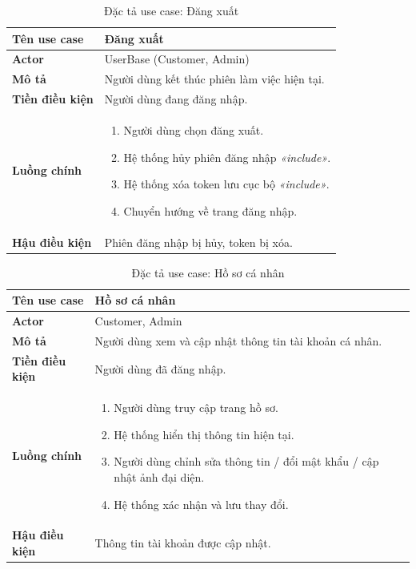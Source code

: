 \begin{table}[H]
\centering
\caption{Đặc tả use case: Đăng xuất}
\begin{tabularx}{\textwidth}{|l|X|}
\hline
\textbf{Tên use case} & Đăng xuất \\
\hline
\textbf{Actor} & UserBase (Customer, Admin) \\
\hline
\textbf{Mô tả} & Người dùng kết thúc phiên làm việc hiện tại. \\
\hline
\textbf{Tiền điều kiện} & Người dùng đang đăng nhập. \\
\hline
\textbf{Luồng chính} &
\begin{enumerate}[noitemsep,topsep=0pt]
    \item Người dùng chọn đăng xuất.
    \item Hệ thống hủy phiên đăng nhập \textit{«include»}.
    \item Hệ thống xóa token lưu cục bộ \textit{«include»}.
    \item Chuyển hướng về trang đăng nhập.
\end{enumerate} \\
\hline
\textbf{Hậu điều kiện} & Phiên đăng nhập bị hủy, token bị xóa. \\
\hline
\end{tabularx}
\end{table}

\begin{table}[H]
\centering
\caption{Đặc tả use case: Hồ sơ cá nhân}
\begin{tabularx}{\textwidth}{|l|X|}
\hline
\textbf{Tên use case} & Hồ sơ cá nhân \\
\hline
\textbf{Actor} & Customer, Admin \\
\hline
\textbf{Mô tả} & Người dùng xem và cập nhật thông tin tài khoản cá nhân. \\
\hline
\textbf{Tiền điều kiện} & Người dùng đã đăng nhập. \\
\hline
\textbf{Luồng chính} &
\begin{enumerate}[noitemsep,topsep=0pt]
    \item Người dùng truy cập trang hồ sơ.
    \item Hệ thống hiển thị thông tin hiện tại.
    \item Người dùng chỉnh sửa thông tin / đổi mật khẩu / cập nhật ảnh đại diện.
    \item Hệ thống xác nhận và lưu thay đổi.
\end{enumerate} \\
\hline
\textbf{Hậu điều kiện} & Thông tin tài khoản được cập nhật. \\
\hline
\end{tabularx}
\end{table}

